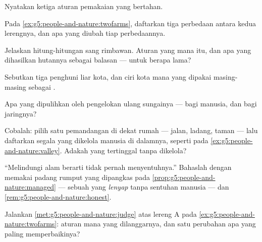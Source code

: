 \begin{exercise}[$\star$]\label{exo:g5:people-and-nature:3}
Nyatakan ketiga aturan pemakaian yang bertahan.
\end{exercise}

\begin{exercise}[$\star$]\label{exo:g5:people-and-nature:4}
Pada \cref{ex:g5:people-and-nature:twofarms}, daftarkan tiga perbedaan
antara kedua lerengnya, dan apa yang diubah tiap perbedaannya.
\end{exercise}

\begin{exercise}[$\star$]\label{exo:g5:people-and-nature:5}
Jelaskan hitung-hitungan sang rimbawan. Aturan yang mana itu, dan apa
yang dihasilkan hutannya sebagai balasan --- untuk berapa lama?
\end{exercise}

\begin{exercise}[$\star$]\label{exo:g5:people-and-nature:6}
Sebutkan tiga penghuni liar kota, dan ciri kota mana yang dipakai
masing-masing sebagai .
\end{exercise}

\begin{exercise}[$\star$]\label{exo:g5:people-and-nature:7}
Apa yang dipulihkan oleh pengelokan ulang sungainya --- bagi manusia,
dan bagi jaringnya?
\end{exercise}

\begin{exercise}[$\star$]\label{exo:g5:people-and-nature:8}
Cobalah: pilih satu pemandangan di dekat rumah --- jalan, ladang,
taman --- lalu daftarkan segala yang dikelola manusia di dalamnya,
seperti pada \cref{ex:g5:people-and-nature:valley}. Adakah yang
tertinggal tanpa dikelola?
\end{exercise}

\begin{exercise}[$\star\star$]\label{exo:g5:people-and-nature:9}
``Melindungi alam berarti tidak pernah menyentuhnya.'' Bahaslah dengan
memakai padang rumput yang dipangkas pada
\cref{prop:g5:people-and-nature:managed} --- sebuah  yang
\emph{lenyap} tanpa sentuhan manusia --- dan
\cref{rem:g5:people-and-nature:honest}.
\end{exercise}

\begin{exercise}[$\star\star$]\label{exo:g5:people-and-nature:10}
Jalankan \cref{met:g5:people-and-nature:judge} atas lereng A pada
\cref{ex:g5:people-and-nature:twofarms}: aturan mana yang
dilanggarnya, dan satu perubahan apa yang paling memperbaikinya?
\end{exercise}

